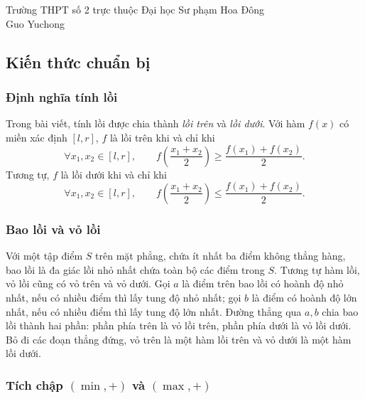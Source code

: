 \documentclass[11pt]{article}
\begin{document}
\begin{center}
Trường THPT số 2 trực thuộc Đại học Sư phạm Hoa Đông\\
Guo Yuchong
\end{center}

\renewcommand{\abstractname}{Tóm tắt}
\begin{abstract}
Khai thác tính chất đặc biệt của hàm số để tối ưu thuật toán là một kỹ thuật
phổ biến và quan trọng trong OI. Tính lồi của hàm số là một trong những tính
chất đẹp và mạnh. Bài viết xoay quanh chủ đề này, khảo sát một số phương pháp
dùng tính lồi để tối ưu thuật toán trong OI.
\end{abstract}

\subsection{Kiến thức chuẩn bị}

\subsubsection{Định nghĩa tính lồi}

Trong bài viết, tính lồi được chia thành \emph{lồi trên} và \emph{lồi dưới}.
Với hàm \(f(x)\) có miền xác định \([l,r]\), \(f\) là lồi trên khi và chỉ khi
\[
  \forall x_1,x_2\in[l,r],\qquad
  f\!\left(\frac{x_1+x_2}{2}\right)\ge
  \frac{f(x_1)+f(x_2)}2.
\]
Tương tự, \(f\) là lồi dưới khi và chỉ khi
\[
  \forall x_1,x_2\in[l,r],\qquad
  f\!\left(\frac{x_1+x_2}{2}\right)\le
  \frac{f(x_1)+f(x_2)}2.
\]

\subsubsection{Bao lồi và vỏ lồi}

Với một tập điểm \(S\) trên mặt phẳng, chứa ít nhất ba điểm không thẳng hàng,
bao lồi là đa giác lồi nhỏ nhất chứa toàn bộ các điểm trong \(S\). Tương tự
hàm lồi, vỏ lồi cũng có vỏ trên và vỏ dưới. Gọi \(a\) là điểm trên bao lồi có
hoành độ nhỏ nhất, nếu có nhiều điểm thì lấy tung độ nhỏ nhất; gọi \(b\) là
điểm có hoành độ lớn nhất, nếu có nhiều điểm thì lấy tung độ lớn nhất. Đường
thẳng qua \(a,b\) chia bao lồi thành hai phần: phần phía trên là vỏ lồi trên,
phần phía dưới là vỏ lồi dưới. Bỏ đi các đoạn thẳng đứng, vỏ trên là một hàm
lồi trên và vỏ dưới là một hàm lồi dưới.

\subsubsection{\texorpdfstring{Tích chập \((\min,+)\) và \((\max,+)\)}{Tích chập min-plus và max-plus}}
\end{document}
